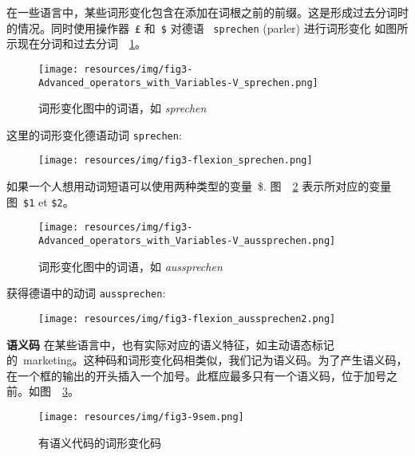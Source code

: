 \noindent 在一些语言中，某些词形变化包含在添加在词根之前的前缀。这是形成过去分词时的情况。同时使用操作器\ \verb+£+ 和\ \verb+$+ 对德语 \ \verb+sprechen+ (parler) 进行词形变化
如图所示现在分词和过去分词\ ~\ref{fig-inflection-sprechen}。

\newpage
\begin{figure}[!htbp]
\begin{center}
\texttt{[image: resources/img/fig3-Advanced\_operators\_with\_Variables-V\_sprechen.png]}
\caption{词形变化图中的词语，如 {\it sprechen}
\label{fig-inflection-sprechen}}
\end{center}
\end{figure}

\noindent 这里的词形变化德语动词 \verb+sprechen+:

\bigskip
\begin{figure}[!ht]
\begin{center}
\texttt{[image: resources/img/fig3-flexion\_sprechen.png]}
\end{center}
\end{figure}

\noindent 如果一个人想用动词短语可以使用两种类型的变量\ \$.
图\ ~\ref{fig-inflection-aussprechen} 表示所对应的变量图\ \verb+$1+ et \verb+$2+。

\bigskip
\begin{figure}[!ht]
\begin{center}
\texttt{[image: resources/img/fig3-Advanced\_operators\_with\_Variables-V\_aussprechen.png]}
\caption{词形变化图中的词语，如 {\it aussprechen}
\label{fig-inflection-aussprechen}}
\end{center}
\end{figure}

\noindent 获得德语中的动词 \verb+aussprechen+:
\bigskip
\begin{figure}[!ht]
\begin{center}
\texttt{[image: resources/img/fig3-flexion\_aussprechen2.png]}
\end{center}
\end{figure}

\bigskip
\noindent \textbf{语义码}
\noindent 在某些语言中，也有实际对应的语义特征，如主动语态标记的\ marketing。这种码和词形变化码相类似，我们记为语义码。为了产生语义码，在一个框的输出的开头插入一个加号。此框应最多只有一个语义码，位于加号之前。如图\ ~\ref{fig-inflection-sem}。

\bigskip
\begin{figure}[!ht]
\begin{center}
\texttt{[image: resources/img/fig3-9sem.png]}
\caption{有语义代码的词形变化码\label{fig-inflection-sem}}
\end{center}
\end{figure}


